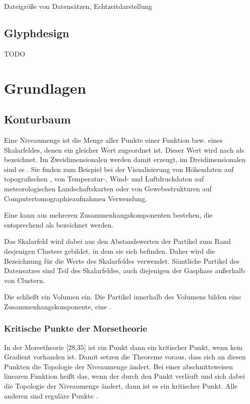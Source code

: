 Dateigröße von Datensätzen, Echtzeitdarstellung

\section{Glyphdesign}

TODO

\chapter{Grundlagen}
\section{Konturbaum}\label{sec:grundlagen:konturbaum}
Eine Niveaumenge ist die Menge aller Punkte einer Funktion bzw. eines Skalarfeldes, denen ein gleicher Wert zugeordnet ist. Dieser Wert wird nach \cite[S.~1]{carr2010flexibleIsosurfaces} als  bezeichnet. Im Zweidimensionalen werden damit  erzeugt, im Dreidimensionalen sind es . Sie finden zum Beispiel bei der Visualisierung von Höhendaten auf topografischen \cite{hurni2010landform} \cite{openstreetmapContours}, von Temperatur-, Wind- und Luftdruckdaten auf meteorologischen Landschaftskarten \cite{hopkins1996weather} oder von Gewebestrukturen auf Computertomographieaufnahmen \cite{tang2014ctImages} Verwendung.

Eine  kann aus mehreren Zusammenhangskomponenten bestehen, die entsprechend \cite[S.~2]{carr2001computingCountourTrees} als  bezeichnet werden.

Das Skalarfeld wird dabei aus den Abstandswerten der Partikel zum Rand desjenigen Clusters gebildet, in dem sie sich befinden. Daher wird die Bezeichnung  für die Werte des Skalarfeldes verwendet. Sämtliche Partikel des Datensatzes sind Teil des Skalarfeldes, auch diejenigen der Gasphase außerhalb von Clustern.

Die  schließt ein Volumen ein. Die Partikel innerhalb des Volumens bilden eine Zusammenhangskomponente, eine .

\subsection{Kritische Punkte der Morsetheorie}

In der Morsetheorie \cite{chiang2005contourTreesUsingMonotonePaths}[28,35] ist ein Punkt dann ein kritischer Punkt, wenn kein Gradient vorhanden ist. Damit setzen die Theoreme voraus, dass sich an diesen Punkten die Topologie der Niveaumenge ändert. Bei einer abschnittsweisen linearen Funktion heißt das, wenn der  durch den Punkt verläuft und sich dabei die Topologie der Niveaumenge ändert, dann ist es ein kritischer Punkt. Alle anderen sind reguläre Punkte \cite{carr2010flexibleIsosurfaces} \cite{chiang2005contourTreesUsingMonotonePaths}.



